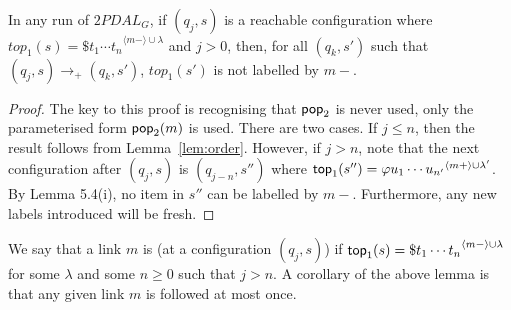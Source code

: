 \begin{lemma} \label{lem:useonceonly} In any run of $2PDAL_G$, if
$(q_j,s)$ is a reachable configuration where $top_1(s) = {\$ t_1
\cdots t_n}^{\langle m- \rangle \cup \lambda}$ and $j > 0$, then,
for all $(q_k,s')$ such that $(q_j,s) \rightarrow_{+} (q_k,s')$,
$top_1(s')$ is not labelled by $m-$.
\end{lemma}

\begin{proof} The key to this proof is recognising that ${\sf pop}_2$
is never used, only the parameterised form ${\sf pop}_2(m)$ is used.
There are two cases. If $j \leq n$, then the result follows from
Lemma~\ref{lem:order}. However, if $j > n$, note that the next configuration after $(q_j,s)$ is $(q_{j-n}, s'')$ where
${\sf top}_1(s'') = {\varphi u_1 \cdots u_{n'}}^{\langle m+ \rangle \cup
\lambda'}$. By Lemma 5.4(i), no item in $s''$ can be labelled by
$m-$. Furthermore, any new labels introduced will be fresh.
\end{proof}

We say that a link $m$ is  (at a configuration
$(q_j,s)$) if ${\sf top}_1(s) = {\$t_1 \cdots t_n}^{\langle m-
\rangle \cup \lambda}$ for some $\lambda$ and some $n \geq 0$ such
that $j > n$. A corollary of the above lemma is that any given
link $m$ is followed at most once.



%

